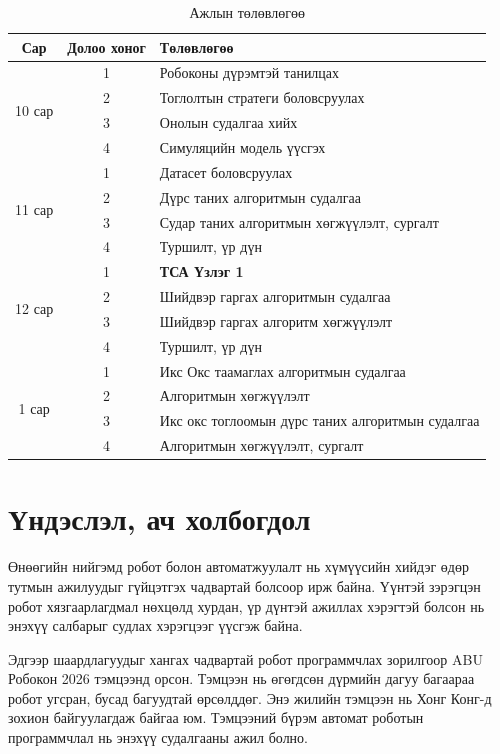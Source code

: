 \documentclass[11pt, a4paper]{report}
\newcommand{\Robocon}{{ABU Робокон 2026}}
\begin{document}
	\begin{table}[h]
		\centering
		\begin{tabular}{|c|c|l|}
			\hline
			Сар & Долоо хоног & Төлөвлөгөө \\ \hline
			\multirow{4}{3cm}{10 сар} & 1 & Робоконы дүрэмтэй танилцах \\ \cline{2-3}
			& 2 & Тоглолтын стратеги боловсруулах \\ \cline{2-3}
			& 3 & Онолын судалгаа хийх \\ \cline{2-3}
			& 4 & Симуляцийн модель үүсгэх \\ \hline
			\multirow{4}{3cm}{11 сар} & 1 & Датасет боловсруулах \\ \cline{2-3}
			& 2 & Дүрс таних алгоритмын судалгаа \\ \cline{2-3}
			& 3 & Судар таних алгоритмын хөгжүүлэлт, сургалт \\ \cline{2-3}
			& 4 & Туршилт, үр дүн \\ \hline
			\multirow{4}{3cm}{12 сар} & 1 & \textbf{ТСА Үзлэг 1} \\ \cline{2-3}
			& 2 & Шийдвэр гаргах алгоритмын судалгаа \\ \cline {2-3}
			& 3 & Шийдвэр гаргах алгоритм хөгжүүлэлт \\ \cline {2-3}
			& 4 & Туршилт, үр дүн \\ \hline
			\multirow{4}{3cm}{1 сар} & 1 & Икс Окс таамаглах алгоритмын судалгаа \\ \cline{2-3}
			& 2 & Алгоритмын хөгжүүлэлт \\ \cline{2-3}
			& 3 & Икс окс тоглоомын дүрс таних алгоритмын судалгаа \\ \cline{2-3}
			& 4 & Алгоритмын хөгжүүлэлт, сургалт \\ \hline
		\end{tabular}
		\caption{Ажлын төлөвлөгөө}
		\label{table:plan}
	\end{table}

	\section{Үндэслэл, ач холбогдол}
	Өнөөгийн нийгэмд робот болон автоматжуулалт нь хүмүүсийн хийдэг өдөр тутмын ажилуудыг гүйцэтгэх чадвартай болсоор ирж байна. Үүнтэй зэрэгцэн робот хязгаарлагдмал нөхцөлд хурдан, үр дүнтэй ажиллах хэрэгтэй болсон нь энэхүү салбарыг судлах хэрэгцээг үүсгэж байна.
	
	Эдгээр шаардлагуудыг хангах чадвартай робот программчлах зорилгоор \Robocon{} тэмцээнд орсон. Тэмцээн нь өгөгдсөн дүрмийн дагуу багаараа робот угсран, бусад багуудтай өрсөлддөг. Энэ жилийн тэмцээн нь Хонг Конг-д зохион байгуулагдаж байгаа юм. Тэмцээний бүрэм автомат роботын программчлал нь энэхүү судалгааны ажил болно.
	
\end{document}
